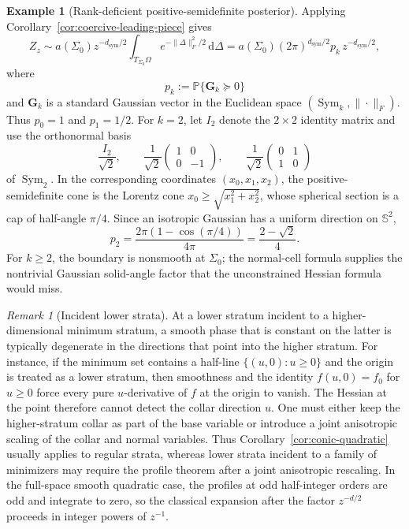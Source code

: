 \documentclass[11pt]{amsart}
\numberwithin{equation}{section}
\theoremstyle{definition}
\newtheorem{example}[theorem]{Example}
\theoremstyle{remark}
\newtheorem{remark}[theorem]{Remark}
\DeclareMathOperator{\Sym}{Sym}
\newcommand{\dd}{\,\mathrm{d}}
\begin{document}
\begin{example}[Rank-deficient positive-semidefinite posterior]
Applying Corollary~\ref{cor:coercive-leading-piece} gives
\[
 Z_z\sim a(\Sigma_0)z^{-d_{\mathrm{sym}}/2}
 \int_{T_{\Sigma_0}\Omega}e^{-\|\Delta\|_F^2/2}\dd\Delta
 =a(\Sigma_0)(2\pi)^{d_{\mathrm{sym}}/2}p_k\,z^{-d_{\mathrm{sym}}/2},
\]
where
\[
 p_k:=\mathbb P\{\mathbf G_k\succeq0\}
\]
and $\mathbf G_k$ is a standard Gaussian vector in the Euclidean space
$(\Sym_k,\|\cdot\|_F)$.
Thus $p_0=1$ and $p_1=1/2$.  For $k=2$, let $I_2$ denote the
$2\times2$ identity matrix and use the orthonormal basis
\[
 \frac{I_2}{\sqrt2},\qquad
 \frac1{\sqrt2}\begin{pmatrix}1&0\\0&-1\end{pmatrix},\qquad
 \frac1{\sqrt2}\begin{pmatrix}
 0&1
 \\
 1&0
 \end{pmatrix}
\]
of $\Sym_2$.  In the corresponding coordinates
$(x_0,x_1,x_2)$, the positive-semidefinite cone is the Lorentz cone
$x_0\ge\sqrt{x_1^2+x_2^2}$, whose spherical section is a cap of half-angle
$\pi/4$.  Since an isotropic Gaussian has a uniform direction on
$\mathbb S^2$,
\[
 p_2=\frac{2\pi(1-\cos(\pi/4))}{4\pi}
 =\frac{2-\sqrt2}{4}.
\]
For $k\ge2$, the boundary is nonsmooth at $\Sigma_0$; the normal-cell
formula supplies the nontrivial Gaussian solid-angle factor that the
unconstrained Hessian formula would miss.
\end{example}

\begin{remark}[Incident lower strata]
At a lower stratum incident to a higher-dimensional minimum stratum, a smooth
phase that is constant on the latter is typically degenerate in the directions
that point into the higher stratum.  For instance, if the minimum set contains
a half-line $\{(u,0):u\ge0\}$ and the origin is treated as a lower stratum,
then smoothness and the identity $f(u,0)=f_0$ for $u\ge0$ force every pure
$u$-derivative of $f$ at the origin to vanish.  The Hessian at the point
therefore cannot detect the collar direction $u$.  One must either keep the
higher-stratum collar as part of the base variable or introduce a joint
anisotropic scaling of the collar and normal variables.  Thus
Corollary~\ref{cor:conic-quadratic} usually applies to regular strata, whereas
lower strata incident to a family of minimizers may require the profile theorem
after a joint anisotropic rescaling.  In the full-space smooth quadratic case,
the profiles at odd half-integer orders are odd and integrate to zero,
so the classical expansion after the factor $z^{-d/2}$ proceeds in integer
powers of $z^{-1}$.
\end{remark}
\end{document}
